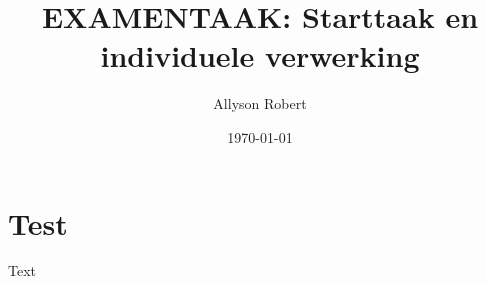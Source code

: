\documentclass{uhreport}
\title{EXAMENTAAK: Starttaak en individuele verwerking}
\author{Allyson Robert}
\date{\today}
\begin{document}
\maketitle
\tableofcontents
\clearpage

\section{Test}
Text

\nocite{*}


\end{document}
